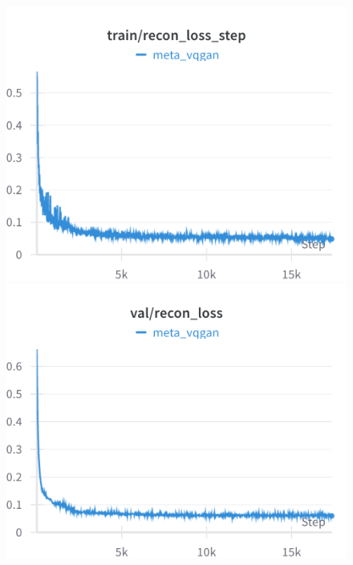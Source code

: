 
\begin{figure}[H]
\includegraphics[width=\linewidth]{detailed_engineering/Meta VQGAN/charts/train_recon_loss_step.png}
\caption{}
\endminipage\hfill
{}
\includegraphics[width=\linewidth]{detailed_engineering/Meta VQGAN/charts/val_recon_loss.png}
\caption{}
\endminipage
\end{figure}

